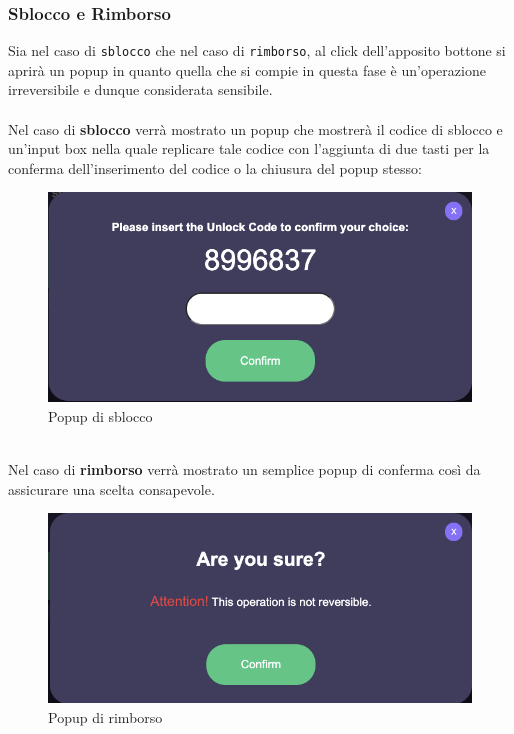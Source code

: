             \subsubsection{Sblocco e Rimborso}
        Sia nel caso di \texttt{sblocco} che nel caso di \texttt{rimborso}, al click dell'apposito bottone si aprirà un popup in quanto quella che si compie in questa fase è un'operazione irreversibile e dunque considerata sensibile.\\\\
        Nel caso di \textbf{sblocco} verrà mostrato un popup che mostrerà il codice di sblocco e un'input box nella quale replicare tale codice con l'aggiunta di due tasti per la conferma dell'inserimento del codice o la chiusura del popup stesso:
        \begin{figure}[H]
            \centering
            \includegraphics[scale=0.3]{immagini/Checkout/UnlockPopUp.png} 
            \caption{Popup di sblocco}
        \end{figure}
        \textbf{}\\
        Nel caso di \textbf{rimborso} verrà mostrato un semplice popup di conferma così da assicurare una scelta consapevole.
        \begin{figure}[H]
            \centering
            \includegraphics[scale=0.3]{immagini/Checkout/RefundPopUp.png} 
            \caption{Popup di rimborso}
        \end{figure}
